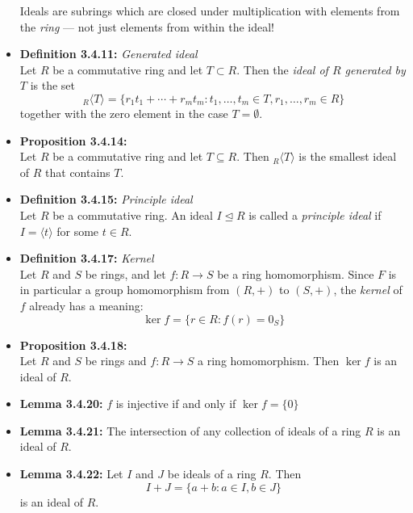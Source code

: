 \documentclass[11pt,a4paper]{article}
\begin{document}
\begin{itemize}
        Ideals are subrings which are closed under multiplication with elements from the
        \emph{ring} --- not just elements from within the ideal!

    \item \textbf{Definition 3.4.11:} \emph{Generated ideal} \\
        Let $R$ be a commutative ring and let $T \subset R$.
        Then the \emph{ideal of $R$ generated by $T$} is the set
        \[
            _R\langle T \rangle = \{ {r_1}{t_1} + \cdots + {r_m}{t_m} : t_1, \ldots, t_m \in T,
            r_1, \ldots, r_m \in R \}
        \]
        together with the zero element in the case $T = \emptyset$.

    \item \textbf{Proposition 3.4.14:} \\
        Let $R$ be a commutative ring and let $T \subseteq R$.
        Then $_R \langle T \rangle$ is the smallest ideal of $R$ that contains $T$.

    \item \textbf{Definition 3.4.15:} \emph{Principle ideal} \\
        Let $R$ be a commutative ring.
        An ideal $I \trianglelefteq R$ is called a \emph{principle ideal} if
        $I = \langle t \rangle$ for some $t \in R$.

    \item \textbf{Definition 3.4.17:} \emph{Kernel} \\
        Let $R$ and $S$ be rings, and let $f : R \to S$ be a ring homomorphism.
        Since $F$ is in particular a group homomorphism from $(R,+)$ to $(S,+)$,
        the \emph{kernel} of $f$ already has a meaning:
        \[
            \ker f = \{ r \in R : f(r) = 0_S \}
        \]

    \item \textbf{Proposition 3.4.18:} \\
        Let $R$ and $S$ be rings and $f : R \to S$ a ring homomorphism.
        Then $\ker f$ is an ideal of $R$.

    \item \textbf{Lemma 3.4.20:} $f$ is injective if and only if $\ker f = \{0\}$

    \item \textbf{Lemma 3.4.21:} The intersection of any collection of ideals of a ring $R$
        is an ideal of $R$.

    \item \textbf{Lemma 3.4.22:} Let $I$ and $J$ be ideals of a ring $R$.
        Then
        \[
            I + J = \{a + b : a \in I, b \in J \}
        \]
        is an ideal of $R$.


\end{itemize}
\end{document}
